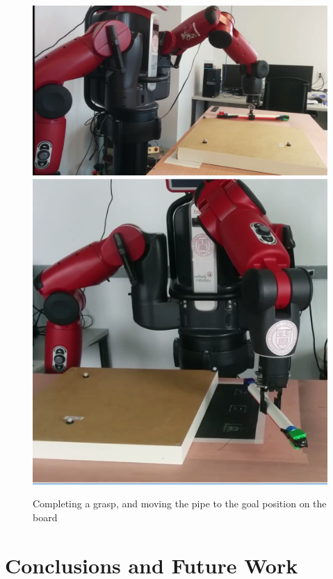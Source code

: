 \documentclass[runningheads,letterpaper]{llncs}
\begin{document}
\begin{figure}[ht]
\centering
	\includegraphics[height=0.3\columnwidth]{images/grasp.png}
	\includegraphics[height=0.3\columnwidth]{images/grasp_lift.png}	
\caption{Completing a grasp, and moving the pipe to the goal position on the board}
\label{fig:grasp}
\end{figure}

\section{Conclusions and Future Work}



\end{document}
